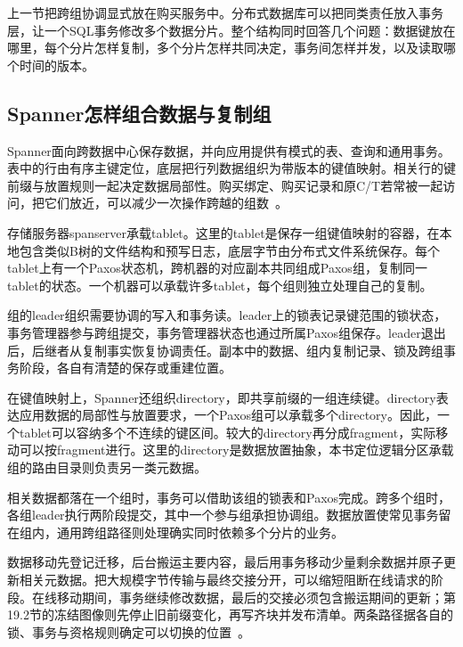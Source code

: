 上一节把跨组协调显式放在购买服务中。分布式数据库可以把同类责任放入事务层，让一个SQL事务修改多个数据分片。整个结构同时回答几个问题：数据键放在哪里，每个分片怎样复制，多个分片怎样共同决定，事务间怎样并发，以及读取哪个时间的版本。

\subsection{Spanner怎样组合数据与复制组}

Spanner面向跨数据中心保存数据，并向应用提供有模式的表、查询和通用事务。表中的行由有序主键定位，底层把行列数据组织为带版本的键值映射。相关行的键前缀与放置规则一起决定数据局部性。购买绑定、购买记录和原C/T若常被一起访问，把它们放近，可以减少一次操作跨越的组数~\cite{spanner2012}。

存储服务器spanserver承载tablet。这里的tablet是保存一组键值映射的容器，在本地包含类似B树的文件结构和预写日志，底层字节由分布式文件系统保存。每个tablet上有一个Paxos状态机，跨机器的对应副本共同组成Paxos组，复制同一tablet的状态。一个机器可以承载许多tablet，每个组则独立处理自己的复制。

组的leader组织需要协调的写入和事务读。leader上的锁表记录键范围的锁状态，事务管理器参与跨组提交，事务管理器状态也通过所属Paxos组保存。leader退出后，后继者从复制事实恢复协调责任。副本中的数据、组内复制记录、锁及跨组事务阶段，各自有清楚的保存或重建位置。


在键值映射上，Spanner还组织directory，即共享前缀的一组连续键。directory表达应用数据的局部性与放置要求，一个Paxos组可以承载多个directory。因此，一个tablet可以容纳多个不连续的键区间。较大的directory再分成fragment，实际移动可以按fragment进行。这里的directory是数据放置抽象，本书定位逻辑分区承载组的路由目录则负责另一类元数据。


相关数据都落在一个组时，事务可以借助该组的锁表和Paxos完成。跨多个组时，各组leader执行两阶段提交，其中一个参与组承担协调组。数据放置使常见事务留在组内，通用跨组路径则处理确实同时依赖多个分片的业务。

数据移动先登记迁移，后台搬运主要内容，最后用事务移动少量剩余数据并原子更新相关元数据。把大规模字节传输与最终交接分开，可以缩短阻断在线请求的阶段。在线移动期间，事务继续修改数据，最后的交接必须包含搬运期间的更新；第19.2节的冻结图像则先停止旧前缀变化，再写齐块并发布清单。两条路径据各自的锁、事务与资格规则确定可以切换的位置~\cite{spanner2012}。


